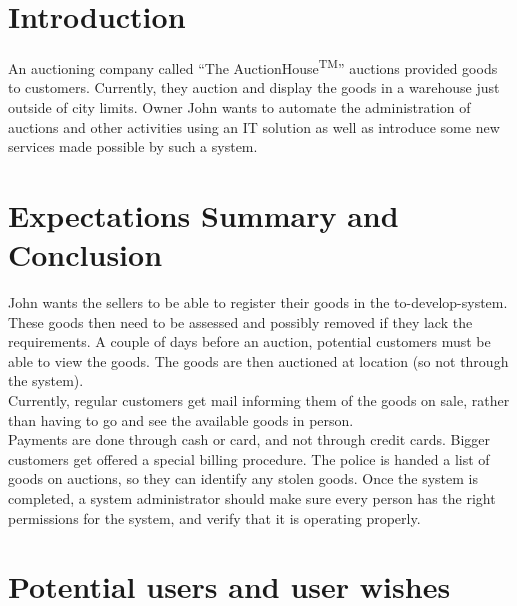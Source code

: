 \section{Introduction}
An auctioning company called ``The AuctionHouse\textsuperscript{TM}'' auctions provided goods to customers. Currently, they auction and display the goods in a warehouse just outside of city limits. Owner John wants to automate the administration of auctions and other activities using an IT solution as well as introduce some new services made possible by such a system.

\section{Expectations Summary and Conclusion}
John wants the sellers to be able to register their goods in the to-develop-system. These goods then need to be assessed and possibly removed if they lack the requirements. A couple of days before an auction, potential customers must be able to view the goods. The goods are then auctioned at location (so not through the system).\\
Currently, regular customers get mail informing them of the goods on sale, rather than having to go and see the available goods in person.\\
Payments are done through cash or card, and not through credit cards. Bigger customers get offered a special billing procedure.
The police is handed a list of goods on auctions, so they can identify any stolen goods.
Once the system is completed, a system administrator should make sure every person has the right permissions for the system, and verify that it is operating properly.

\section{Potential users and user wishes}
